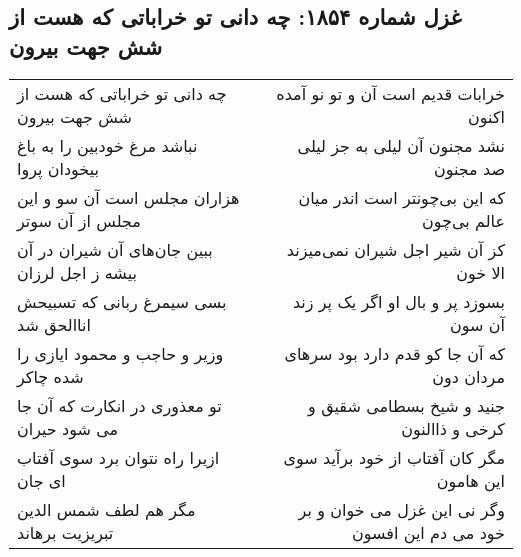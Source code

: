 \begin{center}
\section*{غزل شماره ۱۸۵۴: چه دانی تو خراباتی که هست از شش جهت بیرون}
\label{sec:1854}
\begin{longtable}{l p{0.5cm} r}
چه دانی تو خراباتی که هست از شش جهت بیرون
&&
خرابات قدیم است آن و تو نو آمده اکنون
\\
نباشد مرغ خودبین را به باغ بیخودان پروا
&&
نشد مجنون آن لیلی به جز لیلی صد مجنون
\\
هزاران مجلس است آن سو و این مجلس از آن سوتر
&&
که این بی‌چونتر است اندر میان عالم بی‌چون
\\
ببین جان‌های آن شیران در آن بیشه ز اجل لرزان
&&
کز آن شیر اجل شیران نمی‌میزند الا خون
\\
بسی سیمرغ ربانی که تسبیحش اناالحق شد
&&
بسوزد پر و بال او اگر یک پر زند آن سون
\\
وزیر و حاجب و محمود ایازی را شده چاکر
&&
که آن جا کو قدم دارد بود سرهای مردان دون
\\
تو معذوری در انکارت که آن جا می شود حیران
&&
جنید و شیخ بسطامی شقیق و کرخی و ذاالنون
\\
ازیرا راه نتوان برد سوی آفتاب ای جان
&&
مگر کان آفتاب از خود برآید سوی این هامون
\\
مگر هم لطف شمس الدین تبریزیت برهاند
&&
وگر نی این غزل می خوان و بر خود می دم این افسون
\\
\end{longtable}
\end{center}
